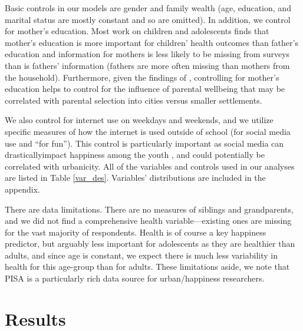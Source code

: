 \documentclass[10pt, letterpaper]{article}
\begin{document}
\begin{spacing}{1.4}
Basic controls in our models are gender and family wealth (age, education, and
marital status are mostly constant and so are omitted). In addition, we control
for mother's education. Most work on children and adolescents finds that
mother's education is more important for children' health outcomes than father's
education \citep{nepal2018matters} and information for mothers is less likely to
be missing from surveys than is fathers' information (fathers are more often
missing than mothers from the household). Furthermore, given the findings of \citet{morrison2024resolving}, controlling for mother's education helps to control for the influence of parental wellbeing that may be correlated with parental selection into cities versus smaller settlements.

We also control for internet use on weekdays and weekends, and we utilize  specific measures of how the
internet is used outside of school (for  social media use and ``for fun''). This control is particularly important as  social media can
drasticallyimpact happiness among the youth
\citep{twengeATL17sep,twenge14}, and could potentially be correlated with
urbanicity. All of the variables and controls used in our analyses are listed
in Table \ref{var_des}. Variables' distributions are included in the appendix.

There are data limitations. There are no measures of siblings
and grandparents, and we did not find a comprehensive health variable---existing ones are
missing for the vast majority of respondents. Health is of course a key
happiness predictor, but arguably less important for adolescents as they are
healthier than adults, and since age is constant, we expect there is much less variability in
health for this age-group than for adults. These limitations aside, we  note
that  PISA is a particularly rich data source  for urban/happiness researchers. %
 
 

\section*{Results}


\end{spacing}
\end{document}
